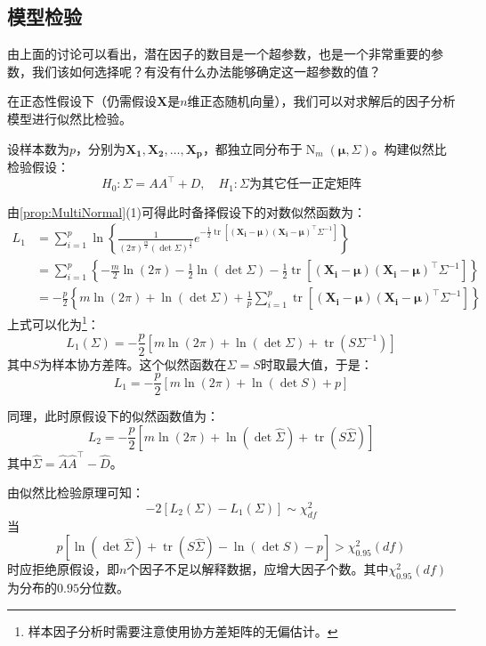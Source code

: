 \subsection{模型检验}
由上面的讨论可以看出，潜在因子的数目是一个超参数，也是一个非常重要的参数，我们该如何选择呢？有没有什么办法能够确定这一超参数的值？\par
\begin{derivation}
	在正态性假设下（仍需假设$\mathbf{X}$是$n$维正态随机向量），我们可以对求解后的因子分析模型进行似然比检验。\par
	设样本数为$p$，分别为$\mathbf{X_1},\mathbf{X_2},\dots,\mathbf{X_p}$，都独立同分布于$\operatorname{N}_m(\boldsymbol{\mu},\Sigma)$。构建似然比检验假设：
	\begin{equation*}
		H_0:\Sigma=AA^{\top}+D,\quad H_1:\Sigma\text{为其它任一正定矩阵}
	\end{equation*}\par
	由\cref{prop:MultiNormal}(1)可得此时备择假设下的对数似然函数为：
	\begin{align*}
		L_1&=\sum_{i=1}^{p}\ln\left\{\frac{1}{(2\pi)^{\frac{m}{2}}(\det\Sigma)^{\frac{1}{2}}}e^{-\frac{1}{2}\operatorname{tr}[(\mathbf{X_i}-\boldsymbol{\mu})(\mathbf{X_i}-\boldsymbol{\mu})^{\top}\Sigma^{-1}]}\right\} \\
		&=\sum_{i=1}^{p}\left\{-\frac{m}{2}\ln(2\pi)-\frac{1}{2}\ln(\det\Sigma)-\frac{1}{2}\operatorname{tr}[(\mathbf{X_i}-\boldsymbol{\mu})(\mathbf{X_i}-\boldsymbol{\mu})^{\top}\Sigma^{-1}]\right\} \\
		&=-\frac{p}{2}\left\{m\ln(2\pi)+\ln(\det\Sigma)+\frac{1}{p}\sum_{i=1}^{p}\operatorname{tr}[(\mathbf{X_i}-\boldsymbol{\mu})(\mathbf{X_i}-\boldsymbol{\mu})^{\top}\Sigma^{-1}]\right\}
	\end{align*}
	上式可以化为\footnote{样本因子分析时需要注意使用协方差矩阵的无偏估计。}：
	\begin{equation*}
		L_1(\Sigma)=-\frac{p}{2}\left[m\ln(2\pi)+\ln(\det\Sigma)+\operatorname{tr}(S\Sigma^{-1})\right]
	\end{equation*}
	其中$S$为样本协方差阵。这个似然函数在$\Sigma=S$时取最大值，于是：
	\begin{equation*}
		L_1=-\frac{p}{2}[m\ln(2\pi)+\ln(\det S)+p]
	\end{equation*}\par
	同理，此时原假设下的似然函数值为：
	\begin{equation*}
		L_2=-\frac{p}{2}\left[m\ln(2\pi)+\ln(\det\hat{\Sigma})+\operatorname{tr}(S\hat{\Sigma})\right]
	\end{equation*}
	其中$\hat{\Sigma}=\hat{A}\hat{A}^{\top}-\hat{D}$。\par
	由似然比检验原理可知：
	\begin{equation*}
	-2[L_2(\Sigma)-L_1(\Sigma)]\sim\chi^2_{df}
	\end{equation*}
	当
	\begin{equation*}
		p[\ln(\det\hat{\Sigma})+\operatorname{tr}(S\hat{\Sigma})-\ln(\det S)-p]>\chi^2_{0.95}(df)
	\end{equation*}
	时应拒绝原假设，即$n$个因子不足以解释数据，应增大因子个数。其中$\chi^2_{0.95}(df)$为分布的$0.95$分位数。
\end{derivation}

